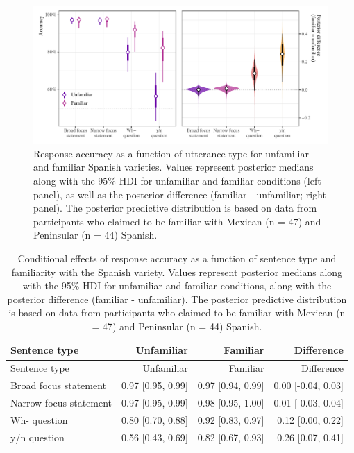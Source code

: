 \documentclass[]{article}
\begin{document}
\begin{figure}
\includegraphics[width=1\linewidth]{../../../../figs/manuscript/learner_variety_familiarity} \caption{Response accuracy as a function of utterance type for unfamiliar and familiar Spanish varieties. Values represent posterior medians along with the 95\% HDI for unfamiliar and familiar conditions (left panel), as well as the posterior difference (familiar - unfamiliar; right panel). The posterior predictive distribution is based on data from participants who claimed to be familiar with Mexican (n = 47) and Peninsular (n = 44) Spanish.}\label{fig:plot-learner-variety-familiarity}
\end{figure}

\begin{longtable}[]{@{}lrrr@{}}
\caption{\label{tab:table-learner-variety-familiarity-conditional-effects}Conditional effects of response accuracy as a
function of sentence type and familiarity with the Spanish variety.
Values represent posterior medians along with the 95\% HDI for unfamiliar
and familiar conditions, along with the posterior difference
(familiar - unfamiliar). The posterior predictive distribution is based on
data from participants who claimed to be familiar with Mexican
(n = 47) and Peninsular
(n = 44) Spanish.}\tabularnewline
\toprule()
Sentence type & Unfamiliar & Familiar & Difference \\
\midrule()
\endfirsthead
\toprule()
Sentence type & Unfamiliar & Familiar & Difference \\
\midrule()
\endhead
Broad focus statement & 0.97 {[}0.95, 0.99{]} & 0.97 {[}0.94, 0.99{]} & 0.00 {[}-0.04, 0.03{]} \\
Narrow focus statement & 0.97 {[}0.95, 0.99{]} & 0.98 {[}0.95, 1.00{]} & 0.01 {[}-0.03, 0.04{]} \\
Wh- question & 0.80 {[}0.70, 0.88{]} & 0.92 {[}0.83, 0.97{]} & 0.12 {[}0.00, 0.22{]} \\
y/n question & 0.56 {[}0.43, 0.69{]} & 0.82 {[}0.67, 0.93{]} & 0.26 {[}0.07, 0.41{]} \\
\bottomrule()
\end{longtable}
\end{document}
